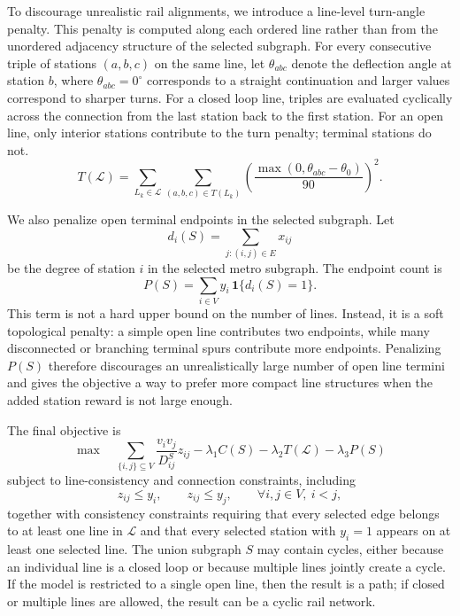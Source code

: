 \documentclass[9pt,a4paper,twocolumn,twoside]{tau-class/tau}
\begin{document}
    To discourage unrealistic rail alignments, we introduce a line-level turn-angle penalty. This penalty is computed along each ordered line rather than from the unordered adjacency structure of the selected subgraph. For every consecutive triple of stations $(a,b,c)$ on the same line, let $\theta_{abc}$ denote the deflection angle at station $b$, where $\theta_{abc}=0^\circ$ corresponds to a straight continuation and larger values correspond to sharper turns. For a closed loop line, triples are evaluated cyclically across the connection from the last station back to the first station. For an open line, only interior stations contribute to the turn penalty; terminal stations do not.
    \begin{equation}
        T(\mathcal{L}) =
        \sum_{L_k \in \mathcal{L}}
        \sum_{(a,b,c)\in T(L_k)}
        \left(
        \frac{\max(0,\theta_{abc}-\theta_0)}{90}
        \right)^2 .
    \end{equation}

    We also penalize open terminal endpoints in the selected subgraph. Let
    \begin{equation}
        d_i(S)=\sum_{j:(i,j)\in E} x_{ij}
    \end{equation}
    be the degree of station $i$ in the selected metro subgraph. The endpoint count is
    \begin{equation}
        P(S)=\sum_{i\in V} y_i\,\mathbf{1}\{d_i(S)=1\}.
    \end{equation}
    This term is not a hard upper bound on the number of lines. Instead, it is a soft topological penalty: a simple open line contributes two endpoints, while many disconnected or branching terminal spurs contribute more endpoints. Penalizing $P(S)$ therefore discourages an unrealistically large number of open line termini and gives the objective a way to prefer more compact line structures when the added station reward is not large enough.

    The final objective is
    \begin{equation}
        \max \quad
        \sum_{\{i,j\}\subseteq V}
        \frac{v_i v_j}{D^S_{ij}} z_{ij}
        - \lambda_1 C(S)
        - \lambda_2 T(\mathcal{L})
        - \lambda_3 P(S)
    \end{equation}
    subject to line-consistency and connection constraints, including
    \begin{equation}
        z_{ij} \leq y_i,\qquad
        z_{ij} \leq y_j,\qquad
        \forall i,j \in V,\ i<j,
    \end{equation}
    together with consistency constraints requiring that every selected edge belongs to at least one line in $\mathcal{L}$ and that every selected station with $y_i=1$ appears on at least one selected line. The union subgraph $S$ may contain cycles, either because an individual line is a closed loop or because multiple lines jointly create a cycle. If the model is restricted to a single open line, then the result is a path; if closed or multiple lines are allowed, the result can be a cyclic rail network.
\end{document}
